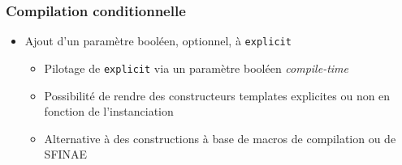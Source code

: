 \documentclass[C++.tex]{subfiles}
\begin{document}
\begin{frame}[fragile]
	\frametitle{Compilation conditionnelle}
	\begin{itemize}
		\item Ajout d'un paramètre booléen, optionnel, à \lstinline|explicit|
		\begin{itemize}
			\item Pilotage de \lstinline|explicit| via un paramètre booléen \textit{compile-time}
			\item Possibilité de rendre des constructeurs templates explicites ou non en fonction de l'instanciation
			\item Alternative à des constructions à base de macros de compilation ou de SFINAE
		\end{itemize}
	\end{itemize}
\end{frame}
\end{document}

